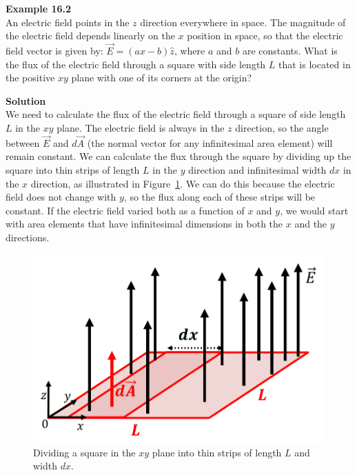 \begin{framed}
\textbf{Example 16.2}\\
An electric field points in the $z$ direction everywhere in space. The magnitude of the electric field depends linearly on the $x$ position in space, so that the electric field vector is given by: $\vec E=(ax -b)\hat z$, where $a$ and $b$ are constants. What is the flux of the electric field through a square with side length $L$ that is located in the positive $xy$ plane with one of its corners at the origin?

\begin{framed}
\textbf{Solution}\\
We need to calculate the flux of the electric field through a square of side length $L$ in the $xy$ plane. The electric field is always in the $z$ direction, so the angle between $\vec E$ and $d\vec A$ (the normal vector for any infinitesimal area element) will remain constant. We can calculate the flux through the square by dividing up the square into thin strips of length $L$ in the $y$ direction and infinitesimal width $dx$ in the $x$ direction, as illustrated in Figure~\ref{fig:gauss:fluxlinx}. We can do this because the electric field does not change with $y$, so the flux along each of these strips will be constant. If the electric field varied both as a function of $x$ and $y$, we would start with area elements that have infinitesimal dimensions in both the $x$ and the $y$ directions.

\begin{figure}[!htbp]
\centering
\includegraphics[width=0.5\linewidth]{files/fluxlinx-e8e921d01654ee11a768fd94b9df938c.png}
\caption[]{Dividing a square in the $xy$ plane into thin strips of length $L$ and width $dx$.}
\label{fig:gauss:fluxlinx}
\end{figure}


\end{framed}
\end{framed}
